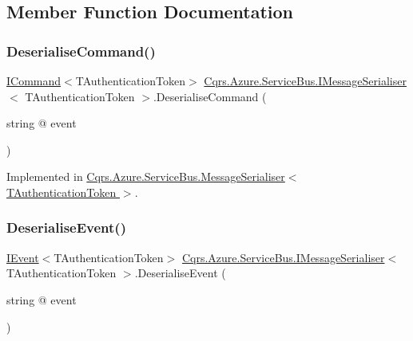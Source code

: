 \subsection{Member Function Documentation}
\mbox{\label{interfaceCqrs_1_1Azure_1_1ServiceBus_1_1IMessageSerialiser_aade6efce33aae849c4c6ed1e24211ecc}} 
\subsubsection{\texorpdfstring{Deserialise\+Command()}{DeserialiseCommand()}}
{\footnotesize\ttfamily \hyperlink{interfaceCqrs_1_1Commands_1_1ICommand}{I\+Command}$<$T\+Authentication\+Token$>$ \hyperlink{interfaceCqrs_1_1Azure_1_1ServiceBus_1_1IMessageSerialiser}{Cqrs.\+Azure.\+Service\+Bus.\+I\+Message\+Serialiser}$<$ T\+Authentication\+Token $>$.Deserialise\+Command (\begin{DoxyParamCaption}\item[{string @}]{event }\end{DoxyParamCaption})}



Implemented in \hyperlink{classCqrs_1_1Azure_1_1ServiceBus_1_1MessageSerialiser_a7cbab381f4758f8dd04cd17e2c5f2c3a}{Cqrs.\+Azure.\+Service\+Bus.\+Message\+Serialiser$<$ T\+Authentication\+Token $>$}.

\mbox{\label{interfaceCqrs_1_1Azure_1_1ServiceBus_1_1IMessageSerialiser_ab65c6e4a8c2a660ceb2236ee11fd33f6}} 
\subsubsection{\texorpdfstring{Deserialise\+Event()}{DeserialiseEvent()}}
{\footnotesize\ttfamily \hyperlink{interfaceCqrs_1_1Events_1_1IEvent}{I\+Event}$<$T\+Authentication\+Token$>$ \hyperlink{interfaceCqrs_1_1Azure_1_1ServiceBus_1_1IMessageSerialiser}{Cqrs.\+Azure.\+Service\+Bus.\+I\+Message\+Serialiser}$<$ T\+Authentication\+Token $>$.Deserialise\+Event (\begin{DoxyParamCaption}\item[{string @}]{event }\end{DoxyParamCaption})}



